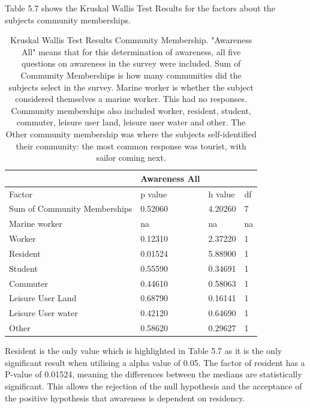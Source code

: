 Table 5.7 shows the Kruskal Wallis Test Results for the factors about the subjects community memberships. 


\begin{table}[H]
    \centering
    \begin{tabular}{|l|l|l|l|}
    \hline
         ~ & \textbf{Awareness All} & ~ & ~ \\ \hline
        Factor & p value & h value & df \\ \hline
        Sum of Community Memberships & 0.52060 & 4.20260 & 7 \\ \hline
        Marine worker & na & na & na \\ \hline
        Worker & 0.12310 & 2.37220 & 1 \\ \hline
        Resident & \cellcolor[HTML]{7df9ff} 0.01524 & 5.88900 & 1 \\ \hline
        Student & 0.55590 & 0.34691 & 1 \\ \hline
        Commuter & 0.44610 & 0.58063 & 1 \\ \hline
        Leisure User Land & 0.68790 & 0.16141 & 1 \\ \hline
        Leisure User water & 0.42120 & 0.64690 & 1 \\ \hline
        Other & 0.58620 & 0.29627 & 1 \\ \hline
    \end{tabular}
    \caption{Kruskal Wallis Test Results Community Membership. "Awareness All" means that for this determination of awareness, all five questions on awareness in the survey were included. Sum of Community Memberships is how many communities did the subjects select in the survey. Marine worker is whether the subject considered themselves a marine worker. This had no responses. Community memberships also included worker, resident, student, commuter, leisure user land, leisure user water and other. The Other community membership was where the subjects self-identified their community: the most common response was tourist, with sailor coming next. }
    \label{Kruskal_wallis_test_general}
\end{table}
Resident is the only value which is highlighted in Table 5.7 as it is the only significant result when utilising a alpha value of 0.05. The factor of resident has a P-value of 0.01524, meaning the differences between the medians are statistically significant. This allows the rejection of the null hypothesis and the acceptance of the positive hypothesis that awareness is dependent on residency. 
\paragraph{}

